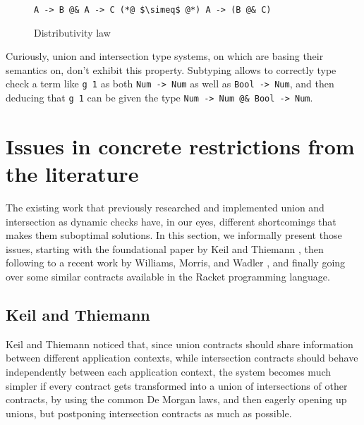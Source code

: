 \documentclass[sigplan,10pt,review,anonymous]{acmart}
\newcommand{\unsure}[2][1=]{}
\newcommand{\info}[2][1=]{}
\newcommand{\nickel}[1]{\lstinline[language=nickel]{#1}}
\begin{document}
\begin{figure}[h]
\begin{lstlisting}[language=nickel]
A -> B @& A -> C (*@ $\simeq$ @*) A -> (B @& C)
\end{lstlisting}
\caption{Distributivity law}
\label{fig:distributivity-law}
\end{figure}

Curiously, union and intersection type systems, on which
\cite{KeilThiemannUnionIntersection} are basing their semantics on, don't
exhibit this property. Subtyping allows to correctly type check a term like
\nickel{g 1} as both \nickel{Num -> Num} as well as
\nickel{Bool -> Num}, and then deducing that \nickel{g 1}
can be given the type \nickel{Num -> Num @& Bool -> Num}.
\unsure{(Yann) I just reworked the wording, but I'm not totally sold on the
argument}

\section{Issues in concrete restrictions from the literature}
\label{sec:issues-literature}
\info{The various papers and the tradeoffs they make}

\unsure{WARNING: what is below is being reworked by Yann}

The existing work that previously researched and implemented
union and intersection
as dynamic checks have, in our eyes, different shortcomings
that makes them suboptimal solutions.
In this section, we informally present those issues,
starting with the foundational paper by Keil and Thiemann
\cite{KeilThiemannUnionIntersection}, then following to a recent
work by Williams, Morris, and Wadler \cite{RootCauseOfBlame}, and
finally going over some similar contracts available in the Racket
programming language.

\subsection{Keil and Thiemann}
\label{sec:keil-thiemann}
\unsure{Subsection title?}
Keil and Thiemann noticed that, since union contracts should share information between
different application contexts, while intersection contracts should behave
independently between each application context, the system becomes much
simpler if every contract gets transformed into a union of intersections
of other contracts, by using the common De Morgan laws,
and then eagerly opening up unions, but postponing intersection
contracts as much as possible.
\end{document}
